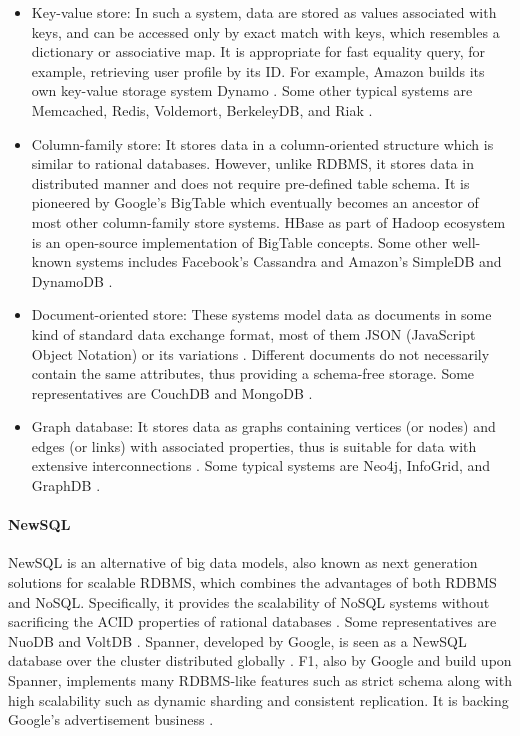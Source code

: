 \documentclass[conference]{IEEEtran}
\providecommand{\tightlist}{%
  \setlength{\itemsep}{0pt}\setlength{\parskip}{0pt}
}
\begin{document}
\begin{itemize}
\tightlist
\item
  Key-value store: In such a system, data are stored as values
  associated with keys, and can be accessed only by exact match with
  keys, which resembles a dictionary or associative map. It is
  appropriate for fast equality query, for example, retrieving user
  profile by its ID. For example, Amazon builds its own key-value
  storage system Dynamo \autocite{Hewage2018}. Some other typical
  systems are Memcached, Redis, Voldemort, BerkeleyDB, and Riak
  \autocite{grolinger_data_2013}.
\item
  Column-family store: It stores data in a column-oriented structure
  which is similar to rational databases. However, unlike RDBMS, it
  stores data in distributed manner and does not require pre-defined
  table schema. It is pioneered by Google's BigTable which eventually
  becomes an ancestor of most other column-family store systems. HBase
  as part of Hadoop ecosystem is an open-source implementation of
  BigTable concepts. Some other well-known systems includes Facebook's
  Cassandra and Amazon's SimpleDB and DynamoDB
  \autocite{grolinger_data_2013,hu2014}.
\item
  Document-oriented store: These systems model data as documents in some
  kind of standard data exchange format, most of them JSON (JavaScript
  Object Notation) or its variations \autocite{grolinger_data_2013}.
  Different documents do not necessarily contain the same attributes,
  thus providing a schema-free storage. Some representatives are CouchDB
  and MongoDB \autocite{Gupta2016}.
\item
  Graph database: It stores data as graphs containing vertices (or
  nodes) and edges (or links) with associated properties, thus is
  suitable for data with extensive interconnections
  \autocite{grolinger_data_2013}. Some typical systems are Neo4j,
  InfoGrid, and GraphDB \autocite{Gupta2016}.
\end{itemize}

\hypertarget{newsql}{%
\paragraph{NewSQL}\label{newsql}}

NewSQL is an alternative of big data models, also known as next
generation solutions for scalable RDBMS, which combines the advantages
of both RDBMS and NoSQL. Specifically, it provides the scalability of
NoSQL systems without sacrificing the ACID properties of rational
databases \autocite{Gupta2016}. Some representatives are NuoDB and
VoltDB \autocite{Gupta2016}. Spanner, developed by Google, is seen as a
NewSQL database over the cluster distributed globally
\autocite{grolinger_data_2013,hu2014}. F1, also by Google and build upon
Spanner, implements many RDBMS-like features such as strict schema along
with high scalability such as dynamic sharding and consistent
replication. It is backing Google's advertisement business
\autocite{hu2014}.
\end{document}

